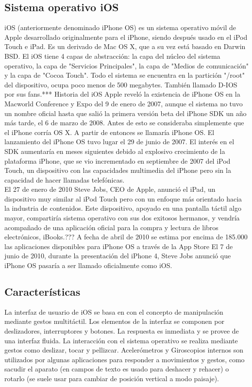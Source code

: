 	\subsection{Sistema operativo iOS}
	iOS (anteriormente denominado iPhone OS) es un sistema operativo móvil de Apple desarrollado originalmente para el iPhone, siendo después usado en el iPod Touch e iPad. Es un derivado de Mac OS X, que a su vez está basado en Darwin BSD. El iOS tiene 4 capas de abstracción: la capa del núcleo del sistema operativo, la capa de "Servicios Principales", la capa de "Medios de comunicación" y la capa de "Cocoa Touch". Todo el sistema se encuentra en la partición "/root" del dispositivo, ocupa poco menos de 500 megabytes. También llamado D-IOS por sus fans.***
	Historia del iOS
	Apple reveló la existencia de iPhone OS en la Macworld Conference y Expo del 9 de enero de 2007, aunque el sistema no tuvo un nombre oficial hasta que salió la primera versión beta del iPhone SDK un año más tarde, el 6 de marzo de 2008. Antes de esto se consideraba simplemente que el iPhone corría OS X. A partir de entonces se llamaría iPhone OS. El lanzamiento del iPhone OS tuvo lugar el 29 de junio de 2007. El interés en el SDK aumentaría en meses siguientes debido al explosivo crecimiento de la plataforma iPhone, que se vio incrementado en septiembre de 2007 del iPod Touch, un dispositivo con las capacidades multimedia del iPhone pero sin la capacidad de hacer llamadas telefónicas. \\
	
	El 27 de enero de 2010 Steve Jobs, CEO de Apple, anunció el iPad, un dispositivo muy similar al iPod Touch pero con un enfoque más orientado hacia la industria de contenidos. Este dispositivo, apoyado en una pantalla táctil algo mayor, compartiría sistema operativo con sus dos exitosos hermanos, y vendría acompañado de una aplicación oficial para la compra y lectura de libros electrónicos, iBooks.??? A fecha de abril de 2010 se estima por encima de 185.000 las aplicaciones disponibles para iPhone OS a través de la App Store El 7 de junio de 2010, durante la presentación del iPhone 4, Steve Jobs anunció que iPhone OS pasaría a ser llamado oficialmente como iOS.
	\subsection{Características}
	La interfaz de usuario de iOS se basa en con el concepto de manipulación mediante gestos multitáctil. Los elementos de la interfaz se componen por deslizadores, interruptores y botones. La respuesta es inmediata y se provee de una interfaz fluida. La interacción con el sistema operativo se realiza mediante gestos como deslizar, tocar y pellizcar. Acelerómetros y Giroscopios internos son utilizados por algunas aplicaciones para responder a movimientos y gestos, como sacudir el aparato (en campos de texto es usado para deshacer y rehacer) o rotarlo (se suele usar para cambiar de posición vertical a modo paisaje). \\
	
